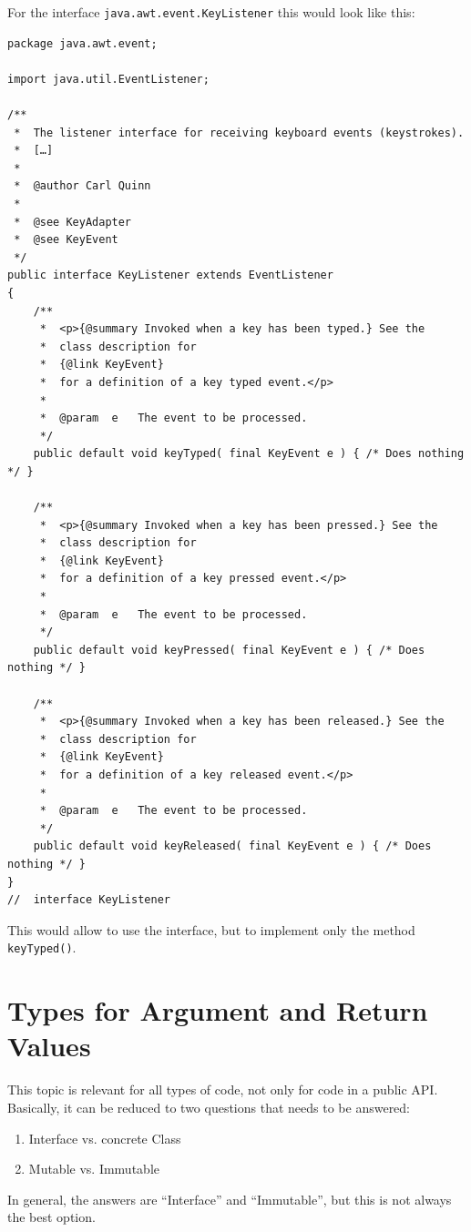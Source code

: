 \documentclass[11pt,a4paper, titlepage, parskip=half, headsepline, footsepline, cleardoublepage=current, headheight=1cm]{scrbook}
\begin{document}
For the interface \lstinline|java.awt.event.KeyListener| this would look like this:
\begin{lstlisting}
package java.awt.event;

import java.util.EventListener;

/**
 *  The listener interface for receiving keyboard events (keystrokes).
 *  […]
 *
 *  @author Carl Quinn
 *
 *  @see KeyAdapter
 *  @see KeyEvent
 */
public interface KeyListener extends EventListener 
{
    /**
     *  <p>{@summary Invoked when a key has been typed.} See the
     *  class description for 
     *  {@link KeyEvent} 
     *  for a definition of a key typed event.</p>
     *
     *  @param	e   The event to be processed.
     */
    public default void keyTyped( final KeyEvent e ) { /* Does nothing */ }

    /**
     *  <p>{@summary Invoked when a key has been pressed.} See the
     *  class description for 
     *  {@link KeyEvent}
     *  for a definition of a key pressed event.</p>
     *
     *  @param  e   The event to be processed.
     */
    public default void keyPressed( final KeyEvent e ) { /* Does nothing */ }

    /**
     *  <p>{@summary Invoked when a key has been released.} See the
     *  class description for 
     *  {@link KeyEvent} 
     *  for a definition of a key released event.</p>
     *
     *  @param  e   The event to be processed.
     */
    public default void keyReleased( final KeyEvent e ) { /* Does nothing */ }
}
//  interface KeyListener
\end{lstlisting}

This would allow to use the interface, but to implement only the method \lstinline|keyTyped()|.

\section{Types for Argument and Return Values}\label{sec:TypesForArgumentAndReturnValues}
This topic is relevant for all types of code, not only for code in a public API. Basically, it can be reduced to two questions that needs to be answered:
\begin{enumerate}
\item{Interface vs. concrete Class}
\item{Mutable vs. Immutable}
\end{enumerate}

In general, the answers are “Interface” and “Immutable”, but this is not always the best option.
\end{document}
